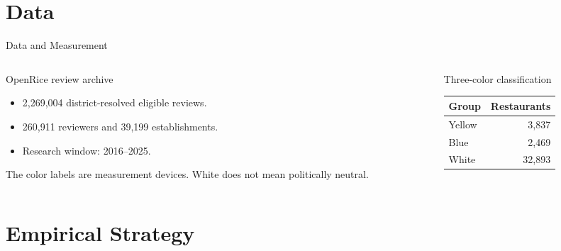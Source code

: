 \documentclass[aspectratio=169,11pt]{beamer}
\begin{document}
\section{Data}

\begin{frame}{Data and Measurement}
\begin{columns}[T,totalwidth=\textwidth]
  \begin{column}{0.52\textwidth}
    \begin{PMpanel}{OpenRice review archive}
      \begin{itemize}
        \item 2,269,004 district-resolved eligible reviews.
        \item 260,911 reviewers and 39,199 establishments.
        \item Research window: 2016--2025.
      \end{itemize}
    \end{PMpanel}
    \vspace{.28cm}
    \begin{PMtakeaway}
      The color labels are measurement devices. White does not mean politically neutral.
    \end{PMtakeaway}
  \end{column}
  \begin{column}{0.43\textwidth}
    \begin{PMpanel}{Three-color classification}
      \centering
      \begin{tabular}{lr}
        \toprule
        Group & Restaurants \\
        \midrule
        Yellow & 3,837 \\
        Blue & 2,469 \\
        White & 32,893 \\
        \bottomrule
      \end{tabular}
    \end{PMpanel}
  \end{column}
\end{columns}
\end{frame}

\section{Empirical Strategy}
\end{document}
